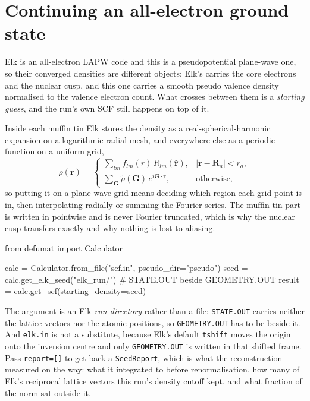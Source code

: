 \documentclass[11pt,a4paper]{article}
\newcommand{\code}[1]{\texttt{\small #1}}
\begin{document}
\section{Continuing an all-electron ground state}

Elk is an all-electron LAPW code and this is a pseudopotential plane-wave one,
so their converged densities are different objects: Elk's carries the core
electrons and the nuclear cusp, and this one carries a smooth pseudo valence
density normalised to the valence electron count. What crosses between them is a
\emph{starting guess}, and the run's own SCF still happens on top of it.

Inside each muffin tin Elk stores the density as a real-spherical-harmonic
expansion on a logarithmic radial mesh, and everywhere else as a periodic
function on a uniform grid,
\begin{equation*}
  \rho(\mathbf r) =
  \begin{cases}
    \sum_{lm} f_{lm}(r)\,R_{lm}(\hat{\mathbf r}), & |\mathbf r - \mathbf R_a| < r_a,\\[4pt]
    \sum_{\mathbf G} \tilde\rho(\mathbf G)\, e^{i\mathbf G\cdot\mathbf r}, & \text{otherwise,}
  \end{cases}
\end{equation*}
so putting it on a plane-wave grid means deciding which region each grid point
is in, then interpolating radially or summing the Fourier series. The muffin-tin
part is written in pointwise and is never Fourier truncated, which is why the
nuclear cusp transfers exactly and why nothing is lost to aliasing.

\begin{pycode}
from defumat import Calculator

calc = Calculator.from_file("scf.in", pseudo_dir="pseudo")
seed = calc.get_elk_seed("elk_run/")     # STATE.OUT beside GEOMETRY.OUT
result = calc.get_scf(starting_density=seed)
\end{pycode}

The argument is an Elk \emph{run directory} rather than a file:
\code{STATE.OUT} carries neither the lattice vectors nor the atomic positions,
so \code{GEOMETRY.OUT} has to be beside it. And \code{elk.in} is not a
substitute, because Elk's default \code{tshift} moves the origin onto the
inversion centre and only \code{GEOMETRY.OUT} is written in that shifted frame.
Pass \code{report=[]} to get back a \code{SeedReport}, which is what the
reconstruction measured on the way: what it integrated to before renormalisation,
how many of Elk's reciprocal lattice vectors this run's density cutoff kept, and
what fraction of the norm sat outside it.
\end{document}
